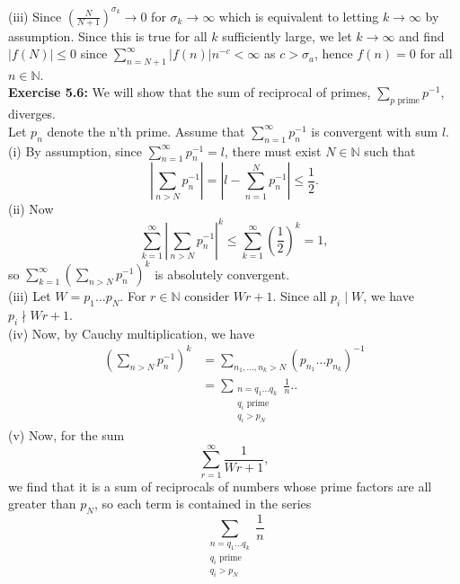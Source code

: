 \documentclass[a4paper]{article}
\begin{document}
    (iii) Since $\left( \frac{N}{N+1} \right)^{\sigma_k} \to 0$ for
    $\sigma_k \to \infty$ which is equivalent to letting $k \to \infty$ by
    assumption. Since this is true for all $k$ sufficiently large, we let $k\to
    \infty$ and find $\left| f(N) \right| \le 0$ since
    $\sum_{n=N+1}^{\infty} |f(n)| n^{-c}<\infty$ as $c> \sigma_a$, hence $f(n) = 0$ for all $n
    \in \mathbb{N}$.\\
    \linebreak
    \textbf{Exercise 5.6:} We will show that the sum of reciprocal of primes,
    $\sum_{p\text{ prime}} p^{-1}$, diverges.\\
    Let $p_n$ denote the n'th prime. Assume that
    $\sum_{n=1}^{\infty} p_n^{-1}$ is convergent with sum $l$.\\
    \linebreak
    (i) By assumption, since $\sum_{n=1}^{\infty} p_n^{-1} = l$, there must
    exist $N \in \mathbb{N}$ such that
    \[
    \left| \sum_{n>N} p_n^{-1} \right| = \left| l - \sum_{n=1}^{N} p_n^{-1} \right| 
    \le \frac{1}{2}.
    \] 
    (ii) Now
    \[
    \sum_{k=1}^{\infty} \left| \sum_{n>N} p_n^{-1} \right|^{k}
    \le \sum_{k=1}^{\infty} \left( \frac{1}{2} \right)^{k} = 1,
    \] 
    so $\sum_{k=1}^{\infty} \left( \sum_{n>N} p_n^{-1} \right)^{k}$ is
    absolutely convergent.\\
    \linebreak
    (iii) Let $W = p_1 \ldots p_N$. For $r \in \mathbb{N}$ consider $Wr +1$.
    Since all $p_i  \mid W$, we have $p_i \nmid Wr+1$.\\
    \linebreak
    (iv) Now, by Cauchy multiplication, we have
    \begin{align*}
        \left( \sum_{n>N} p_n^{-1} \right)^{k}
        &= \sum_{n_1, \ldots, n_k > N} \left( p_{n_1} \ldots p_{n_k}
        \right)^{-1}\\
        &= \sum_{\substack{n = q_1 \ldots q_k \\ q_i \text{ prime}\\
        q_i > p_N}} \frac{1}{n}.
    .\end{align*}
    (v) Now, for the sum
    \[
    \sum_{r=1}^{\infty} \frac{1}{Wr+1},
    \] 
    we find that it is a sum of reciprocals of numbers whose prime factors are
    all greater than $p_N$, so each term is contained in the series
    \[
    \sum_{\substack{n=q_1 \ldots q_k\\ q_i \text{ prime} \\ q_i > p_N}}
    \frac{1}{n}
\]
\end{document}
